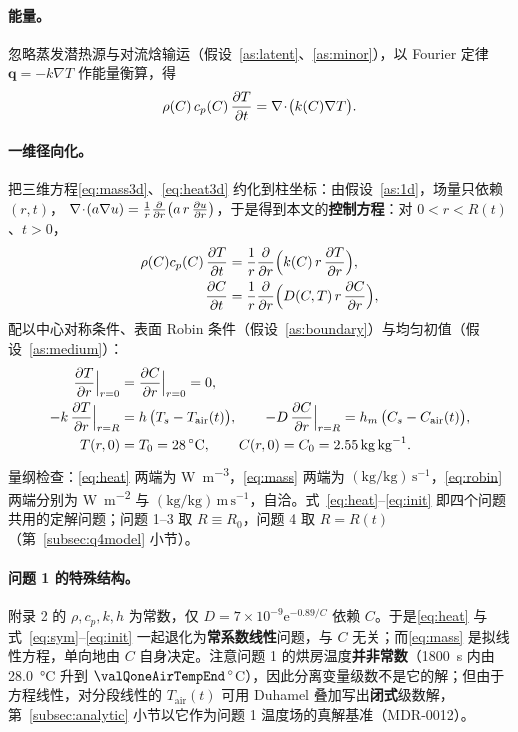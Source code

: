 \paragraph{能量。} 忽略蒸发潜热源与对流焓输运（假设~\ref{as:latent}、\ref{as:minor}），以 Fourier 定律 $\bm q=-k\nabla T$ 作能量衡算，得
\begin{equation}
\rho(C)\,c_p(C)\,\frac{\partial T}{\partial t}=\nabla\!\cdot\!\bigl(k(C)\nabla T\bigr).
\label{eq:heat3d}
\end{equation}

\paragraph{一维径向化。} 把三维方程\eqref{eq:mass3d}、\eqref{eq:heat3d} 约化到柱坐标：由假设~\ref{as:1d}，场量只依赖 $(r,t)$， $\nabla\!\cdot\!(a\nabla u)=\frac1r\frac{\partial }{\partial r}\bigl(a\,r\,\frac{\partial u}{\partial r}\bigr)$，于是得到本文的\textbf{控制方程}：对 $0<r<R(t)$、$t>0$，
\begin{align}
\rho(C)c_p(C)\,\frac{\partial T}{\partial t}&=\frac1r\frac{\partial }{\partial r}\Bigl(k(C)\,r\,\frac{\partial T}{\partial r}\Bigr), \label{eq:heat}\\
\frac{\partial C}{\partial t}&=\frac1r\frac{\partial }{\partial r}\Bigl(D(C,T)\,r\,\frac{\partial C}{\partial r}\Bigr), \label{eq:mass}
\end{align}
配以中心对称条件、表面 Robin 条件（假设~\ref{as:boundary}）与均匀初值（假设~\ref{as:medium}）：
\begin{align}
\frac{\partial T}{\partial r}\Big|_{r=0}&=\frac{\partial C}{\partial r}\Big|_{r=0}=0, \label{eq:sym}\\
-k\,\frac{\partial T}{\partial r}\Big|_{r=R}&=h\,\bigl(T_s-T_{\mathrm{air}}(t)\bigr),\qquad
-D\,\frac{\partial C}{\partial r}\Big|_{r=R}=h_m\,\bigl(C_s-C_{\mathrm{air}}(t)\bigr), \label{eq:robin}\\
T(r,0)&=T_0=\SI{28}{\celsius},\qquad C(r,0)=C_0=\SI{2.55}{\kilo\gram\per\kilo\gram}. \label{eq:init}
\end{align}
量纲检查：\eqref{eq:heat} 两端为 \si{\watt\per\cubic\meter}，\eqref{eq:mass} 两端为 $\mathrm{(kg/kg)\,s^{-1}}$，\eqref{eq:robin} 两端分别为 \si{\watt\per\square\meter} 与 $\mathrm{(kg/kg)\,m\,s^{-1}}$，自洽。式~\eqref{eq:heat}--\eqref{eq:init} 即四个问题共用的定解问题；问题 1--3 取 $R\equiv R_0$，问题 4 取 $R=R(t)$（第~\ref{subsec:q4model} 小节）。

\paragraph{问题 1 的特殊结构。} 附录 2 的 $\rho,c_p,k,h$ 为常数，仅 $D=7\times10^{-9}\mathrm{e}^{-0.89/C}$ 依赖 $C$。于是\eqref{eq:heat} 与式~\eqref{eq:sym}--\eqref{eq:init} 一起退化为\textbf{常系数线性}问题，与 $C$ 无关；而\eqref{eq:mass} 是拟线性方程，单向地由 $C$ 自身决定。注意问题 1 的烘房温度\textbf{并非常数}（\SI{1800}{\second} 内由 \SI{28.0}{\celsius} 升到 $\valQoneAirTempEnd\,^\circ$C），因此分离变量级数不是它的解；但由于方程线性，对分段线性的 $T_{\mathrm{air}}(t)$ 可用 Duhamel 叠加写出\textbf{闭式}级数解，第~\ref{subsec:analytic} 小节以它作为问题 1 温度场的真解基准（MDR-0012）。

